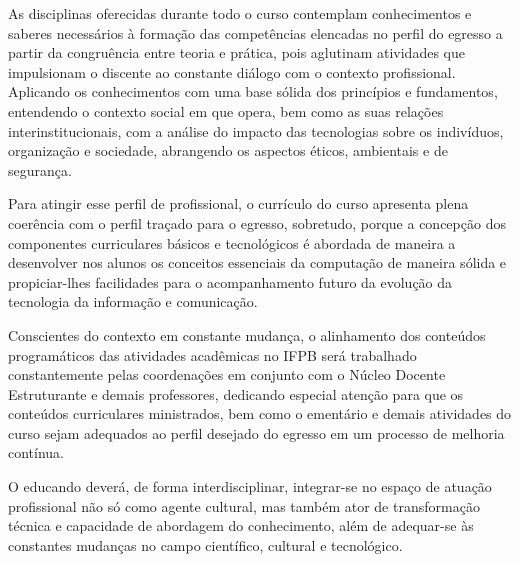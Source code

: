 As disciplinas oferecidas durante todo o curso contemplam conhecimentos e saberes necessários à formação das competências elencadas no perfil do egresso a partir da congruência entre teoria e prática, pois aglutinam atividades que impulsionam o discente ao constante diálogo com o contexto profissional. Aplicando os conhecimentos com uma base sólida dos princípios e fundamentos, entendendo o contexto social em que opera, bem como as suas relações interinstitucionais, com a análise do impacto das tecnologias sobre os indivíduos, organização e sociedade, abrangendo os aspectos éticos, ambientais e de segurança.

Para atingir esse perfil de profissional, o currículo do curso apresenta plena coerência com o perfil traçado para o egresso, sobretudo, porque a concepção dos componentes curriculares básicos e tecnológicos é abordada de maneira a desenvolver nos alunos os conceitos essenciais da computação de maneira sólida e propiciar-lhes facilidades para o acompanhamento futuro da evolução da tecnologia da informação e comunicação.

Conscientes do contexto em constante mudança, o alinhamento dos conteúdos programáticos das atividades acadêmicas no IFPB será trabalhado constantemente pelas coordenações em conjunto com o Núcleo Docente Estruturante e demais professores, dedicando especial atenção para que os conteúdos curriculares ministrados, bem como o ementário e demais atividades do curso sejam adequados ao perfil desejado do egresso em um processo de melhoria contínua.

O educando deverá, de forma interdisciplinar, integrar-se no espaço de atuação profissional não só como agente cultural, mas também ator de transformação técnica e capacidade de abordagem do conhecimento, além de adequar-se às constantes mudanças no campo científico, cultural e tecnológico.


\newpage
